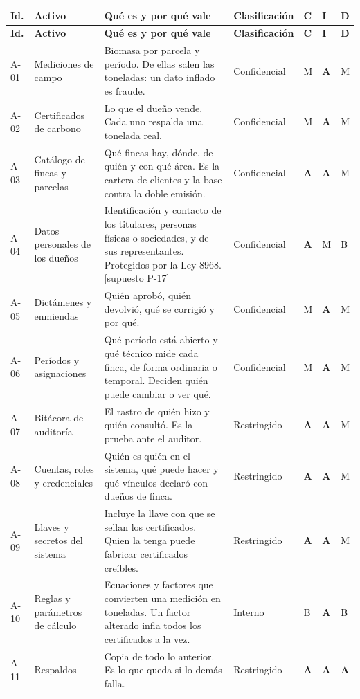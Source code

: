 \documentclass[11pt,letterpaper]{article}
\newcommand{\cab}[1]{\textbf{\rmfamily #1}}
\newcommand{\supu}[1]{\textrm{\footnotesize [supuesto #1]}}
\newcommand{\alto}{\textbf{A}}
\begin{document}
{\small
\renewcommand{\arraystretch}{1.14}
\begin{longtable}{@{}L{0.9cm} L{3.4cm} L{5.6cm} L{2.1cm} C{0.7cm} C{0.7cm} C{0.7cm}@{}}
\toprule
\cab{Id.} & \cab{Activo} & \cab{Qué es y por qué vale} & \cab{Clasificación} & \cab{C} & \cab{I} & \cab{D} \\
\midrule
\endfirsthead
\toprule
\cab{Id.} & \cab{Activo} & \cab{Qué es y por qué vale} & \cab{Clasificación} & \cab{C} & \cab{I} & \cab{D} \\
\midrule
\endhead
\bottomrule
\endfoot
A-01 & Mediciones de campo & Biomasa por parcela y período. De ellas salen las toneladas: un dato inflado es fraude. & Confidencial & M & \alto & M \\
A-02 & Certificados de carbono & Lo que el dueño vende. Cada uno respalda una tonelada real. & Confidencial & M & \alto & M \\
A-03 & Catálogo de fincas y parcelas & Qué fincas hay, dónde, de quién y con qué área. Es la cartera de clientes y la base contra la doble emisión. & Confidencial & \alto & \alto & M \\
A-04 & Datos personales de los dueños & Identificación y contacto de los titulares, personas físicas o sociedades, y de sus representantes. Protegidos por la Ley 8968. \supu{P-17} & Confidencial & \alto & M & B \\
A-05 & Dictámenes y enmiendas & Quién aprobó, quién devolvió, qué se corrigió y por qué. & Confidencial & M & \alto & M \\
A-06 & Períodos y asignaciones & Qué período está abierto y qué técnico mide cada finca, de forma ordinaria o temporal. Deciden quién puede cambiar o ver qué. & Confidencial & M & \alto & M \\
A-07 & Bitácora de auditoría & El rastro de quién hizo y quién consultó. Es la prueba ante el auditor. & Restringido & \alto & \alto & M \\
A-08 & Cuentas, roles y credenciales & Quién es quién en el sistema, qué puede hacer y qué vínculos declaró con dueños de finca. & Restringido & \alto & \alto & M \\
A-09 & Llaves y secretos del sistema & Incluye la llave con que se sellan los certificados. Quien la tenga puede fabricar certificados creíbles. & Restringido & \alto & \alto & M \\
A-10 & Reglas y parámetros de cálculo & Ecuaciones y factores que convierten una medición en toneladas. Un factor alterado infla todos los certificados a la vez. & Interno & B & \alto & B \\
A-11 & Respaldos & Copia de todo lo anterior. Es lo que queda si lo demás falla. & Restringido & \alto & \alto & \alto \\
\end{longtable}
}
\end{document}
